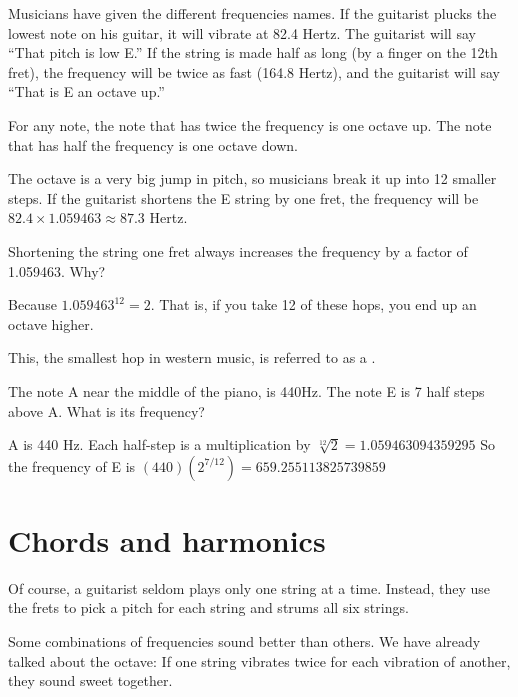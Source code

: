 Musicians have given the different frequencies names. If the guitarist
plucks the lowest note on his guitar, it will vibrate at 82.4
Hertz. The guitarist will say ``That pitch is low E.'' If the string is made
half as long (by a finger on the 12th fret), the frequency will be
twice as fast (164.8 Hertz), and the guitarist will say ``That is E an
octave up.''

For any note, the note that has twice the frequency is one octave
up. The note that has half the frequency is one octave down.

The octave is a very big jump in pitch, so musicians break it up into
12 smaller steps. If the guitarist shortens the E string by one fret,
the frequency will be $82.4 \times 1.059463 \approx 87.3$ Hertz. 

Shortening the string one fret always increases the frequency by a factor of 1.059463. Why?

Because $1.059463^12 = 2$. That is, if you take 12 of these hops, you
end up an octave higher.

This, the smallest hop in western music, is referred to as a .

\begin{Exercise}[title={Notes and frequencies}, label=note_to_frequency]

The note A near the middle of the piano, is 440Hz. The note E is 7 half steps above A.  What is its frequency?
 
\end{Exercise}
\begin{Answer}[ref=note_to_frequency]

  A is 440 Hz.  Each half-step is a multiplication by $\sqrt[12]{2} = 1.059463094359295$
  So the frequency of E is $(440)(2^{7/12}) = 659.255113825739859$

\end{Answer}


\section{Chords and harmonics}

Of course, a guitarist seldom plays only one string at a
time. Instead, they use the frets to pick a pitch for each string and
strums all six strings.

Some combinations of frequencies sound better than others. We have
already talked about the octave: If one string vibrates twice for each
vibration of another, they sound sweet together.

